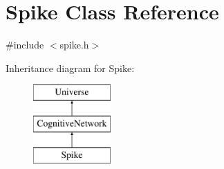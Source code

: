 \hypertarget{classSpike}{}\section{Spike Class Reference}
\label{classSpike}


{\ttfamily \#include $<$spike.\+h$>$}

Inheritance diagram for Spike\+:\begin{figure}[H]
\begin{center}
\leavevmode
\includegraphics[height=3.000000cm]{classSpike}
\end{center}
\end{figure}
